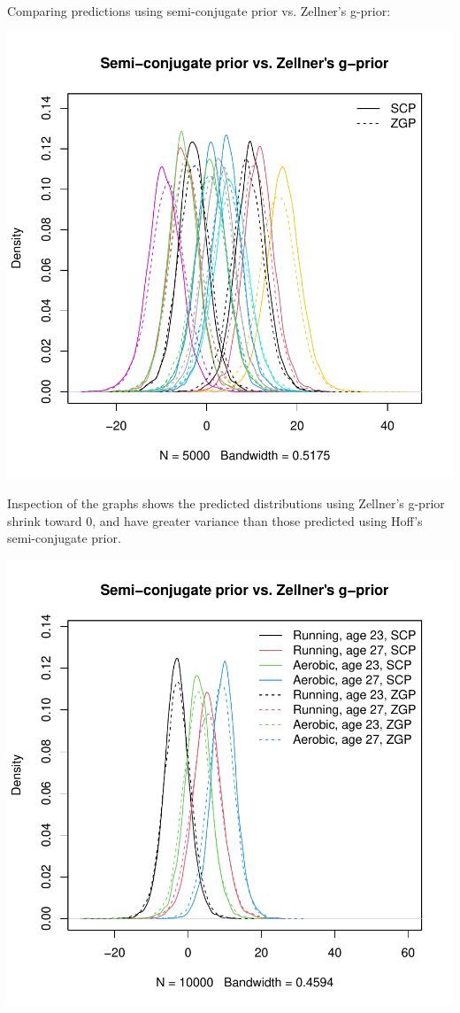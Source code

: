 \documentclass[12pt, a4paper]{article}
\begin{document}
\clearpage

Comparing predictions using semi-conjugate prior vs. Zellner's g-prior:

\includegraphics{Thesis_v1-019}

Inspection of the graphs shows the predicted distributions using Zellner's g-prior shrink toward 0, and have greater variance than those predicted using Hoff's semi-conjugate prior.

\includegraphics{Thesis_v1-020}
\end{document}

